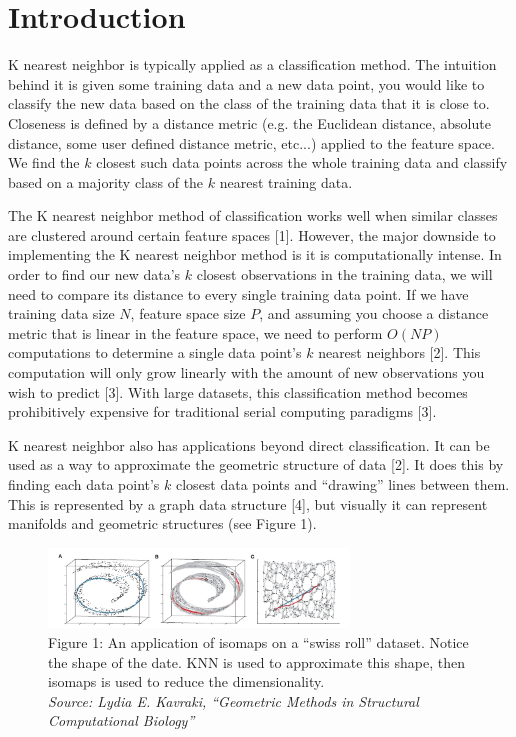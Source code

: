 \section{Introduction}

\vspace{5 mm}
\noindent
K nearest neighbor is typically applied as a classification method. The 
intuition behind it is given some training data and a new data point, you would 
like to classify the new data based on the class of the training data that it 
is close to. Closeness is defined by a distance metric (e.g. the Euclidean 
distance, absolute distance, some user defined distance metric, etc...) applied 
to the feature space. We find the $k$ closest such data points across the whole 
training data and classify based on a majority class of the $k$ nearest 
training data.

\vspace{5 mm}
\noindent
The K nearest neighbor method of classification works well when similar classes 
are clustered around certain feature spaces [1]. However, the major downside to 
implementing the K nearest neighbor method is it is computationally intense. 
In order to find our new data's $k$ closest observations in the training data, 
we will need to compare its distance to every single training data point. 
If we have training data size $N$, feature space size $P$, and assuming you 
choose a distance metric that is linear in the feature space, we need to 
perform $O(NP)$ computations to determine a single data point's $k$ nearest 
neighbors [2]. This computation will only grow linearly with the amount of new 
observations you wish to predict [3]. With large datasets, this classification 
method becomes prohibitively expensive for traditional serial computing 
paradigms [3].


\vspace{5 mm}
\noindent
K nearest neighbor also has applications beyond direct classification. It can 
be used as a way to approximate the geometric structure of data [2]. It does 
this by finding each data point's $k$ closest data points and ``drawing'' lines 
between them. This is represented by a graph data structure [4], but visually it 
can represent manifolds and geometric structures (see Figure 1).

\begin{figure}[h]
\includegraphics[width=8cm]{manifold}\\
Figure 1: An application of isomaps on a ``swiss roll'' dataset. Notice the 
shape of the date. KNN is used to approximate this shape, then isomaps is used 
to reduce the dimensionality.\\ 
\textit{Source: Lydia E. Kavraki, ``Geometric Methods in Structural
Computational Biology''}
\centering
\end{figure}

